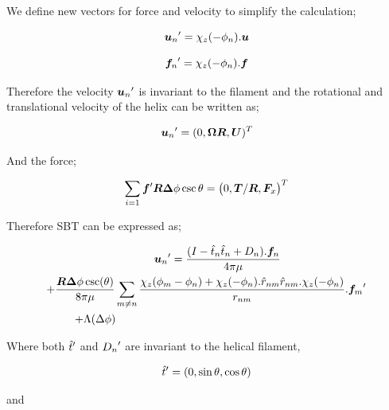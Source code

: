 \documentclass[12pt,a4paper,titlepage]{report}
\begin{document}
We define new vectors for force and velocity to simplify the calculation;



\begin{equation}
{\bm{u}_n}\rq{}= \chi_z(-\phi_n). \bm{u}
\label{NewVelo}
\end{equation}

\begin{equation}
{\bm{f}_n}\rq{}= \chi_z(-\phi_n). \bm{f}
\label{NewForce}
\end{equation}

Therefore the velocity ${\bm{u}_n}\rq{}$ is invariant to the filament and the rotational and translational velocity 
of the helix can be written as;

\begin{equation}
{\bm{u}_n}\rq{}= (0, \bm{\Omega} \bm{R} , \bm{U})^T
\label{NewVelo1}
\end{equation}

And the force;


\begin{equation}
\sum_{i=1} {\bm{f}}\rq{} \bm{R} \bm{\Delta}\phi \csc \theta = {\big(0, \bm{T}/\bm{R}, \bm{F}_x \big)}^T
\label{Newforce1}
\end{equation}

Therefore \ac*{SBT} can be expressed as;

\begin{multline}
\qquad {\bm{u}_n}\rq{}= \frac{(I- \hat{t}_n\hat{t}_n + D_n). \bm{f}_n}{4\pi \mu}\\
+ \frac{\bm{R}\bm{\Delta}\phi \csc (\theta)}{8 \pi \mu} \sum_{m \neq n}  \frac{ \chi_z(\phi_m - \phi_n)+ \chi_z(-\phi_n).\hat{r}_{nm}\hat{r}_{nm}. \chi_z(-\phi_n)}{r_{nm}}. {\bm{f}_m}\rq{}\\
+ \Lambda (\Delta \phi) \qquad \qquad \qquad \qquad \qquad \qquad \qquad \qquad \qquad \qquad
\label{NewVelo2}
\end{multline} 



Where both ${\hat{t}}\rq{}$ and ${D_n}\rq{}$ are invariant to the helical filament,


\begin{equation}
{\hat{t}}\rq{}= (0, \sin \theta, \cos \theta)
\label{invariant}
\end{equation}


and 

\end{document}
